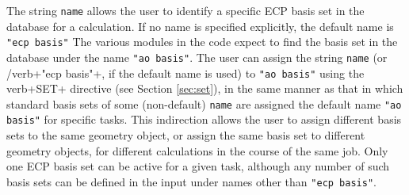 % 
% 
% 

The string \verb+name+ allows the user to identify a specific ECP basis set
in the database for a calculation.  If no name is specified explicitly, the
default name is  \verb+"ecp basis"+  The various modules in the code expect 
to find the
basis set in the database under the name \verb+"ao basis"+.  The user can
assign the string \verb+name+ (or /verb+"ecp basis"+, if the default name 
is used) to \verb+"ao basis"+ using the verb+SET+
directive (see Section \ref{sec:set}), in the same manner as that in
which standard basis sets of some (non-default) \verb+name+ 
are assigned the default name \verb+"ao basis"+ 
for specific tasks.  This indirection allows the user to assign different
basis sets to the same geometry object, or assign the same basis set to 
different geometry objects, for different calculations in
the course of the same job.  Only one ECP basis set can be active for a
given task, although any number of such basis sets can be defined in the
input under names other than \verb+"ecp basis"+.

